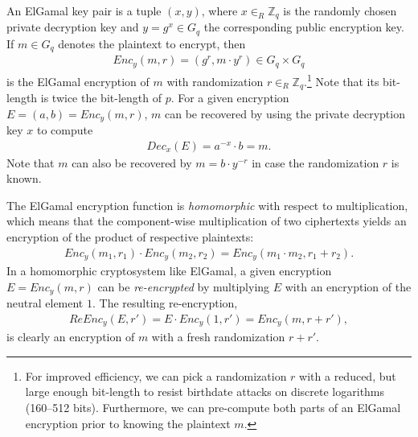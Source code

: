 \documentclass[bibtotoc,halfparskip,oneside]{scrreprt}
\begin{document}
An ElGamal key pair is a tuple $(x,y)$, where $x\in_R\mathbb{Z}_q$ is the randomly chosen private decryption key and $y=g^x\in G_q$ the corresponding public encryption key. If $m\in G_q$ denotes the plaintext to encrypt, then 
\begin{align}
	\mathit{Enc}_y(m,r)=(g^r,m\cdot y^r)\in G_q\times G_q
\end{align} 
is the ElGamal encryption of $m$ with randomization $r \in_R\mathbb{Z}_q$.\footnote{For improved efficiency, we can pick a randomization $r$ with a reduced, but large enough bit-length to resist birthdate attacks on discrete logarithms (160--512 bits). Furthermore, we can pre-compute both parts of an ElGamal encryption prior to knowing the plaintext $m$.} Note that its bit-length is twice the bit-length of $p$. For a given encryption $E=(a,b)=\mathit{Enc}_y(m,r)$, $m$ can be recovered by using the private decryption key $x$ to compute 
\begin{align}
	\mathit{Dec}_x(E)=a^{-x}\cdot b = m.
\end{align} 
Note that $m$ can also be recovered by $m=b\cdot y^{-r}$ in case the randomization $r$ is known. 

The ElGamal encryption function is \emph{homomorphic} with respect to multiplication, which means that the component-wise multiplication of two ciphertexts yields an encryption of the product of respective plaintexts:
\begin{align}
	\mathit{Enc}_y(m_1,r_1)\cdot\mathit{Enc}_y(m_2,r_2)=\mathit{Enc}_y(m_1\cdot m_2,r_1+r_2).
\end{align}
In a homomorphic cryptosystem like ElGamal, a given encryption $E=\mathit{Enc}_y(m,r)$ can be \emph{re-encrypted} by multiplying $E$ with an encryption of the neutral element $1$. The resulting re-encryption, 
\begin{align}
	\mathit{ReEnc}_y(E,r')=E\cdot\mathit{Enc}_y(1,r')=\mathit{Enc}_y(m,r+r'),
\end{align}
is clearly an encryption of $m$ with a fresh randomization $r+r'$.
\end{document}
